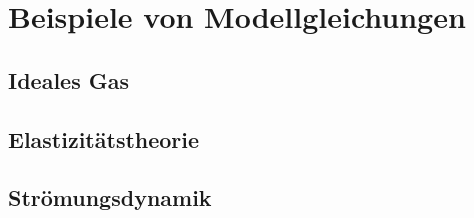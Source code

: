 %
%
%
\section{Beispiele von Modellgleichungen}
\subsection{Ideales Gas}

\subsection{Elastizitätstheorie}

\subsection{Strömungsdynamik}
